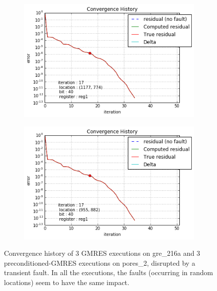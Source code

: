 \begin{figure}[h]
\begin{minipage}[b]{0.48\linewidth}
\begin{subfigure}[t]{\linewidth}
		\centering
		\includegraphics[width=\linewidth]{figures/pores_2/convergence_history_location_1.png}
		\caption{}\label{fig:pores_2_conv_hist_location_1}
	\end{subfigure}
    \quad
    \begin{subfigure}[t]{\linewidth}
		\centering
		\includegraphics[width=\linewidth]{figures/pores_2/convergence_history_location_2.png}
		\caption{}\label{fig:pores_2_conv_hist_location_2}
	\end{subfigure}

    
	\end{minipage}
	\caption{Convergence history of 3 GMRES executions on gre_216a and 3 preconditioned-GMRES executions on pores_2, disrupted by a transient fault. In all the executions, the faults (occurring in random locations) seem to have the same impact.}\label{fig:conv_hist_location}
\end{figure}


